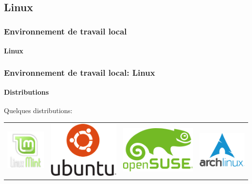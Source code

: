 \documentclass{beamer}
\begin{document}
\subsection{Linux}

\begin{frame}
\frametitle{Environnement de travail local}
\framesubtitle{Linux}

\end{frame}

\begin{frame}
\frametitle{Environnement de travail local: Linux}
\framesubtitle{Distributions}

Quelques distributions:

\begin{tabular}{llll}
	\includegraphics[width=.2\textwidth]{..//img/Bweb01-environnement/mint-logo.png} & \includegraphics[width=.2\textwidth]{..//img/Bweb01-environnement/ubuntu-logo.png} &
	\includegraphics[width=.2\textwidth]{..//img/Bweb01-environnement/opensuse-logo.png} &
	\includegraphics[width=.2\textwidth]{..//img/Bweb01-environnement/arch-logo.png} \\
	

\end{tabular}
\end{frame}
\end{document}
